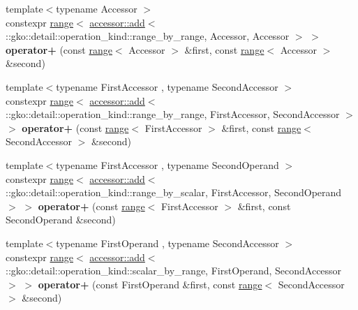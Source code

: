 \begin{DoxyCompactItemize}
\item 
\mbox{\label{namespacegko_a1313bcbb37e83bf24a111edfebb83e44}} 
{\footnotesize template$<$typename Accessor $>$ }\\constexpr \hyperlink{classgko_1_1range}{range}$<$ \hyperlink{structgko_1_1accessor_1_1add}{accessor\+::add}$<$ \+::gko\+::detail\+::operation\+\_\+kind\+::range\+\_\+by\+\_\+range, Accessor, Accessor $>$ $>$ {\bfseries operator+} (const \hyperlink{classgko_1_1range}{range}$<$ Accessor $>$ \&first, const \hyperlink{classgko_1_1range}{range}$<$ Accessor $>$ \&second)
\item 
\mbox{\label{namespacegko_a0d04205743fc18e740caee6b8cb8720c}} 
{\footnotesize template$<$typename First\+Accessor , typename Second\+Accessor $>$ }\\constexpr \hyperlink{classgko_1_1range}{range}$<$ \hyperlink{structgko_1_1accessor_1_1add}{accessor\+::add}$<$ \+::gko\+::detail\+::operation\+\_\+kind\+::range\+\_\+by\+\_\+range, First\+Accessor, Second\+Accessor $>$ $>$ {\bfseries operator+} (const \hyperlink{classgko_1_1range}{range}$<$ First\+Accessor $>$ \&first, const \hyperlink{classgko_1_1range}{range}$<$ Second\+Accessor $>$ \&second)
\item 
\mbox{\label{namespacegko_add2193faa27b6fcc5c7220923141a3ad}} 
{\footnotesize template$<$typename First\+Accessor , typename Second\+Operand $>$ }\\constexpr \hyperlink{classgko_1_1range}{range}$<$ \hyperlink{structgko_1_1accessor_1_1add}{accessor\+::add}$<$ \+::gko\+::detail\+::operation\+\_\+kind\+::range\+\_\+by\+\_\+scalar, First\+Accessor, Second\+Operand $>$ $>$ {\bfseries operator+} (const \hyperlink{classgko_1_1range}{range}$<$ First\+Accessor $>$ \&first, const Second\+Operand \&second)
\item 
\mbox{\label{namespacegko_a15048e6bc74da6120729e407b5c74f30}} 
{\footnotesize template$<$typename First\+Operand , typename Second\+Accessor $>$ }\\constexpr \hyperlink{classgko_1_1range}{range}$<$ \hyperlink{structgko_1_1accessor_1_1add}{accessor\+::add}$<$ \+::gko\+::detail\+::operation\+\_\+kind\+::scalar\+\_\+by\+\_\+range, First\+Operand, Second\+Accessor $>$ $>$ {\bfseries operator+} (const First\+Operand \&first, const \hyperlink{classgko_1_1range}{range}$<$ Second\+Accessor $>$ \&second)

\end{DoxyCompactItemize}
